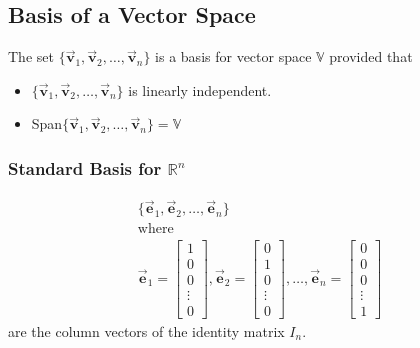 \documentclass[12pt, landscape, twocolumn]{article}
\let\oldvec\vec
\renewcommand{\vec}[1]{\oldvec{\mathbf{ #1 } } }                    %
\begin{document}
    \subsection{Basis of a Vector Space}
    The set $\{\vec{v}_1, \vec{v}_2, \ldots, \vec{v}_n\}$ is a basis for vector space $\mathbb{V}$ provided that

    \begin{itemize}
        \item $\{\vec{v}_1, \vec{v}_2, \ldots, \vec{v}_n\}$ is linearly independent.
        \item Span$\{\vec{v}_1, \vec{v}_2, \ldots, \vec{v}_n\} = \mathbb{V}$
    \end{itemize}

        \subsubsection{Standard Basis for $\mathbb{R}^n$}
        \begin{equation}\label{eq:basis_for_rn}
        \begin{aligned}
            \{\vec{e}_1, \vec{e}_2, \ldots, \vec{e}_n\}\\
            \text{where}\\
            \vec{e}_1 = \left[ \begin{array}{c}
                1\\
                0\\
                0\\
                \vdots\\
                0
            \end{array}\right],
            \vec{e}_2 = \left[ \begin{array}{c}
                0\\
                1\\
                0\\
                \vdots\\
                0
            \end{array}\right], \ldots,
            \vec{e}_n = \left[ \begin{array}{c}
                0\\
                0\\
                0\\
                \vdots\\
                1
            \end{array}\right]
        \end{aligned}
        \end{equation}
        are the column vectors of the identity matrix $I_n$.
\end{document}
